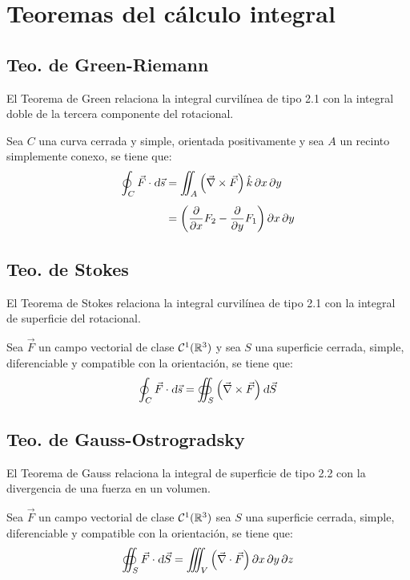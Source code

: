 \chapter{Teoremas del cálculo integral}

\section{Teo. de Green-Riemann}

El Teorema de Green relaciona la integral curvilínea de tipo 2.1 con la integral doble de la tercera componente del rotacional.

Sea $C$ una curva cerrada y simple, orientada positivamente y sea $A$ un recinto simplemente conexo, se tiene que:
\begin{align*}
    \oint_C \Vec{F} \cdot \textsl{d} \Vec{s}
    &= \iint_A \left( \Vec{\nabla} \times \Vec{F} \right) \hat{k} \, \partial x \, \partial y
    \\[1ex]
    &= \left( \dfrac{\partial}{\partial x} F_2 - \dfrac{\partial}{\partial y} F_1 \right) \partial x \, \partial y
\end{align*}

\section{Teo. de Stokes}

El Teorema de Stokes relaciona la integral curvilínea de tipo 2.1 con la integral de superficie del rotacional.

Sea $\Vec{F}$ un campo vectorial de clase $\mathcal{C}^{1} (\mathbb{R}^3)$ y sea $S$ una superficie cerrada, simple, diferenciable y compatible con la orientación, se tiene que:
\begin{equation*}
    \oint_C \Vec{F} \cdot \textsl{d} \Vec{s} = \oiint_S \left( \Vec{\nabla} \times \Vec{F} \right) \textsl{d} \Vec{S}
\end{equation*}

\section{Teo. de Gauss-Ostrogradsky}

El Teorema de Gauss relaciona la integral de superficie de tipo 2.2 con la divergencia de una fuerza en un volumen.

Sea $\Vec{F}$ un campo vectorial de clase $\mathcal{C}^{1} (\mathbb{R}^3)$ sea $S$ una superficie cerrada, simple, diferenciable y compatible con la orientación, se tiene que:
\begin{equation*}
    \oiint_S \Vec{F} \cdot \textsl{d} \Vec{S} = \iiint_V \left( \Vec{\nabla} \cdot \Vec{F} \right) \partial x \, \partial y \, \partial z
\end{equation*}